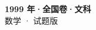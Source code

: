 \documentclass[zihao=-4, a4paper]{ctexart}
\begin{document}
\begin{center}
  {\Large\bfseries 1999 年·全国卷·文科}\\[4pt]
  {\large 数学 · 试题版}
\end{center}
\medskip
{}

\end{document}
